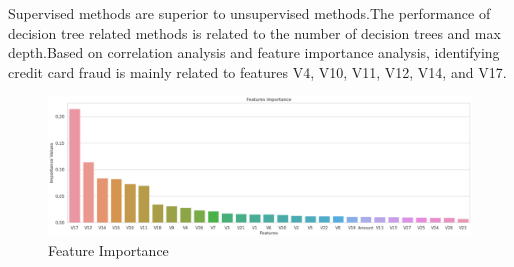 Supervised methods are superior to unsupervised methods.The performance of decision tree related methods is related to the number of decision trees and max depth.Based on correlation analysis and feature importance analysis, identifying credit card fraud is mainly related to features V4, V10, V11, V12, V14, and V17.
	\begin{figure}[H]
	\centering
\includegraphics[scale=0.3]{fi.eps}
	\caption{Feature Importance}\label{fig:OutAspect-target}
\end{figure}






